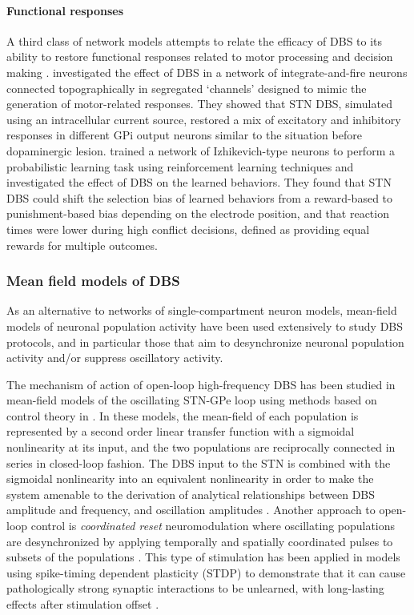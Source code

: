 %
\paragraph{Functional responses}
A third class of network models attempts to relate the efficacy of DBS to its ability
to restore functional responses related to motor processing and decision making
\cite{frank_hold_2007,santaniello_closed-loop_2011,kumar_role_2011,humphries_network_2012,mandali_probing_2016}.
\cite{humphries_network_2012} investigated the effect of DBS in a network of integrate-and-fire neurons
connected topographically in segregated `channels' designed to mimic the generation
of motor-related responses. They showed that STN DBS, simulated using an intracellular current
source, restored a mix of excitatory and inhibitory responses in different GPi output neurons
similar to the situation before dopaminergic lesion.
\cite{mandali_probing_2016} trained a network of Izhikevich-type neurons to perform a
probabilistic learning task using reinforcement learning techniques and investigated the
effect of DBS on the learned behaviors. They found that STN DBS could shift the selection
bias of learned behaviors from a reward-based to punishment-based bias depending on
the electrode position, and that reaction times were lower during high conflict
decisions, defined as providing equal rewards for multiple outcomes.
%

%
\subsubsection{Mean field models of DBS}
%
%
%
%
%
%

As an alternative to networks of single-compartment neuron models, mean-field models
of neuronal population activity \cite{deco_dynamic_2008} have been
used extensively to study DBS protocols, and in particular those that aim to
desynchronize neuronal population activity and/or suppress oscillatory activity.

%
%
The mechanism of action of open-loop high-frequency DBS has been studied in mean-field
models of the oscillating STN-GPe loop using methods based on control theory
in \cite{de_paor_analysis_2009,davidson_application_2014,davidson_analysis_2016}.
In these models, the mean-field of each population is represented by a second order
linear transfer function with a sigmoidal nonlinearity at its input, and the two
populations are reciprocally connected in series in closed-loop fashion.
The DBS input to the STN is combined with the sigmoidal nonlinearity into an equivalent
nonlinearity in order to make the system amenable to the derivation of analytical
relationships between DBS amplitude and frequency, and oscillation amplitudes \cite{davidson_application_2014}.
%
%
Another approach to open-loop control is \textit{coordinated reset} neuromodulation
where oscillating populations are desynchronized by applying temporally and spatially
coordinated pulses to subsets of the populations \cite{tass_model_2003}. This type
of stimulation has been applied in models using spike-timing dependent plasticity
(STDP) to demonstrate that it can cause pathologically strong synaptic interactions
to be unlearned, with long-lasting effects after stimulation offset \cite{tass_long-term_2006}.

